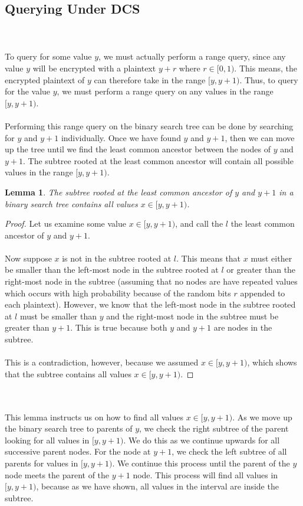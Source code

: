 \documentclass[12pt]{article}
\newtheorem{lemma}[theorem]{Lemma}
\begin{document}
\subsection{Querying Under DCS} \\ \\
  To query for some value $y$, we must actually perform a range query, since any value $y$ will be encrypted with a plaintext $y + r$ where $r \in [0,1)$. This means, the encrypted plaintext of $y$ can therefore take in the range $[y, y + 1)$. Thus, to query for the value $y$, we must perform a range query on any values in the range $[y, y+1)$. \\ \\
Performing this range query on the binary search tree can be done by searching for $y$ and $y+1$ individually. Once we have found $y$ and $y+1$, then we can move up the tree until we find the least common ancestor between the nodes of $y$ and $y+1$. The subtree rooted at the least common ancestor will contain all possible values in the range $[y, y+1)$.
  \begin{lemma}
    The subtree rooted at the least common ancestor of $y$ and $y+1$ in a binary search tree contains all values $x \in [y, y+1)$.
  \end{lemma}
  \begin{proof}
Let us examine some value $x \in [y, y+1)$, and call the $l$ the least common ancestor of $y$ and $y+1$. \\ \\
Now suppose $x$ is not in the subtree rooted at $l$. This means that $x$ must either be smaller than the left-most node in the subtree rooted at $l$ or greater than the right-most node in the subtree (assuming that no nodes are have repeated values which occurs with high probability because of the random bits $r$ appended to each plaintext). However, we know that the left-most node in the subtree rooted at $l$ must be smaller than $y$ and the right-most node in the subtree must be greater than $y+1$. This is true because both $y$ and $y+1$ are nodes in the subtree. \\ \\
This is a contradiction, however, because we assumed $x \in [y, y+1)$, which shows that the subtree contains all values $x \in [y, y+1)$.
\end{proof} \\ \\This lemma instructs us on how to find all values $x \in [y, y+1)$. As we move up the binary search tree to parents of $y$, we check the right subtree of the parent looking for all values in $[y, y+1)$. We do this as we continue upwards for all successive parent nodes. For the node at $y+1$, we check the left subtree of all parents for values in $[y, y+1)$. We continue this process until the parent of the $y$ node meets the parent of the $y+1$ node. This process will find all values in $[y, y+1)$, because as we have shown, all values in the interval are inside the subtree. \\ \\
\end{document}
